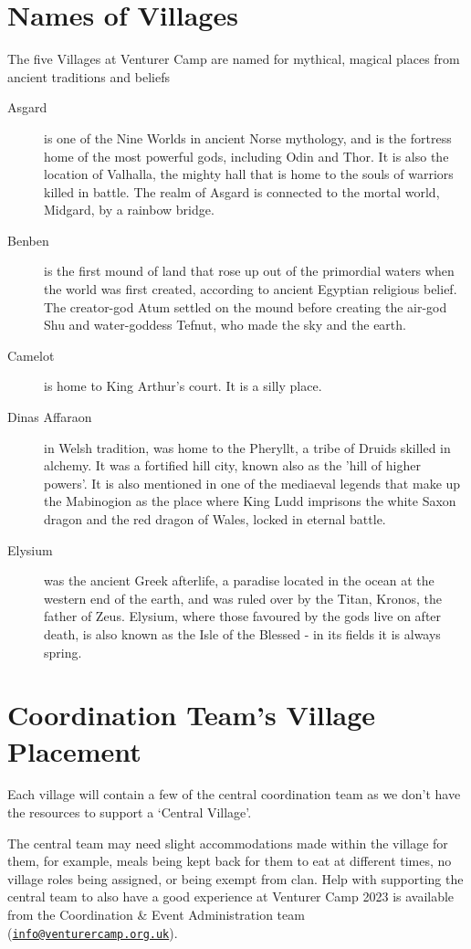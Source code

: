 \documentclass[a4paper, 11pt]{report}
\makeatletter
\newcommand{\nl}{\newline}
\newcommand{\infoemail}{\href{mailto:info@venturercamp.org.uk}{\texttt{info@venturercamp.org.uk}}}
\makeatother
\begin{document}
\section{Names of Villages}
The five Villages at Venturer Camp are named for mythical, magical places from ancient traditions and beliefs
\begin{description}
    \item[Asgard] is one of the Nine Worlds in ancient Norse mythology, and is the fortress home of the most powerful gods, including Odin and Thor. It is also the location of Valhalla, the mighty hall that is home to the souls of warriors killed in battle. The realm of Asgard is connected to the mortal world, Midgard, by a rainbow bridge.
    \item[Benben] is the first mound of land that rose up out of the primordial waters when the world was first created, according to ancient Egyptian religious belief. The creator-god Atum settled on the mound before creating the air-god Shu and water-goddess Tefnut, who made the sky and the earth.
    \item[Camelot] is home to King Arthur's court. It is a silly place.
    \item[Dinas Affaraon] in Welsh tradition, was home to the Pheryllt, a tribe of Druids skilled in alchemy. It was a fortified hill city, known also as the 'hill of higher powers'. It is also mentioned in one of the mediaeval legends that make up the Mabinogion as the place where King Ludd imprisons the white Saxon dragon and the red dragon of Wales, locked in eternal battle.
    \item[Elysium] was the ancient Greek afterlife, a paradise located in the ocean at the western end of the earth, and was ruled over by the Titan, Kronos, the father of Zeus. Elysium, where those favoured by the gods live on after death, is also known as the Isle of the Blessed - in its fields it is always spring.
\end{description}

\section{Coordination Team's Village Placement}
Each village will contain a few of the central coordination team as we don't have the resources to support a `Central Village'.\nl

The central team may need slight accommodations made within the village for them, for example, meals being kept back for them to eat at different times, no village roles being assigned, or being exempt from clan. Help with supporting the central team to also have a good experience at Venturer Camp 2023 is available from the Coordination \& Event Administration team (\infoemail).\nl
\end{document}
